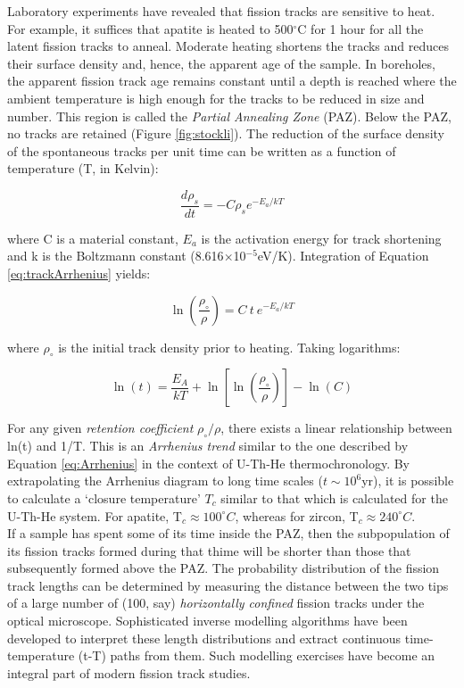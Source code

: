 Laboratory experiments have revealed that fission tracks are sensitive
to heat.  For example, it suffices that apatite is heated to
500$^{\circ}$C for 1 hour for all the latent fission tracks to
anneal. Moderate heating shortens the tracks and reduces their surface
density and, hence, the apparent age of the sample. In boreholes, the
apparent fission track age remains constant until a depth is reached
where the ambient temperature is high enough for the tracks to be
reduced in size and number.  This region is called the \emph{Partial
  Annealing Zone} (PAZ). Below the PAZ, no tracks are retained (Figure
\ref{fig:stockli}). The reduction of the surface density of the
spontaneous tracks per unit time can be written as a function of
temperature (T, in Kelvin):

\begin{equation}
\frac{d\rho_s}{dt} = -C \rho_s e^{-E_a/kT}
\label{eq:trackArrhenius}
\end{equation}

where C is a material constant, $E_a$ is the activation energy for
track shortening and k is the Boltzmann constant
(8.616$\times$10$^{-5}$eV/K). Integration of Equation
\ref{eq:trackArrhenius} yields:

\begin{equation}
\ln\left(\frac{\rho_\circ}{\rho}\right) = C~t~e^{-E_a/kT}
\label{eq:lnrho0rho}
\end{equation}

where $\rho_\circ$ is the initial track density prior to
heating. Taking logarithms:

\begin{equation}
\ln(t) = \frac{E_A}{kT} + \ln\left[\ln\left(\frac{\rho_\circ}{\rho}\right)\right] - \ln(C)
\label{eq:lnt}
\end{equation}

For any given \emph{retention coefficient} $\rho_\circ/\rho$, there
exists a linear relationship between ln(t) and 1/T. This is an
\emph{Arrhenius trend} similar to the one described by Equation
\ref{eq:Arrhenius} in the context of U-Th-He thermochronology.  By
extrapolating the Arrhenius diagram to long time scales
($t\sim10^6$yr), it is possible to calculate a `closure temperature'
$T_c$ similar to that which is calculated for the U-Th-He system. For
apatite, T$_c \approx 100^{\circ}C$, whereas for zircon, T$_c \approx
240^{\circ}C$.\\

If a sample has spent some of its time inside the PAZ, then the
subpopulation of its fission tracks formed during that thime will be
shorter than those that subsequently formed above the PAZ. The
probability distribution of the fission track lengths can be
determined by measuring the distance between the two tips of a large
number of (100, say) \emph{horizontally confined} fission tracks under
the optical microscope.  Sophisticated inverse modelling algorithms
have been developed to interpret these length distributions and
extract continuous time-temperature (t-T) paths from them. Such
modelling exercises have become an integral part of modern fission
track studies.

